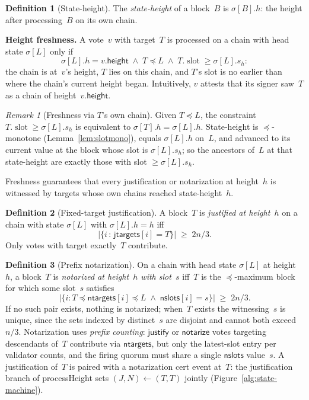 \ifx\litemode\undefined\documentclass{article}\fi
\newcommand{\slot}[0]{\ensuremath{\operatorname{\mathrm{slot}}}}
\newcommand{\height}{\mathsf{height}}
\newcommand{\just}{\ensuremath{\mathsf{justify}}\xspace}
\newcommand{\notar}{\ensuremath{\mathsf{notarize}}\xspace}
\newcommand{\jtargets}{\mathsf{jtargets}}
\newcommand{\ntargets}{\mathsf{ntargets}}
\newcommand{\nslots}{\mathsf{nslots}}
\newcommand{\processHeight}{\textsf{processHeight}\xspace}
\renewcommand{\paragraph}[1]{\vspace{7pt}\noindent\textbf{#1}}
\theoremstyle{plain}
\theoremstyle{definition}
\newtheorem{definition}{Definition}
\theoremstyle{remark}
\newtheorem{remark}{Remark}
\begin{document}
\begin{definition}[State-height]\label{def:sheight}
The \emph{state-height} of a block~$B$ is $\sigma[B].h$: the height after processing~$B$ on its own chain.
\end{definition}

\paragraph{Height freshness.}
A vote~$v$ with target~$T$ is processed on a chain with head state $\sigma[L]$ only if
\[
  \sigma[L].h = v.\height \;\wedge\; T \preceq L \;\wedge\; T.\slot \geq \sigma[L].s_h:
\]
the chain is at~$v$'s height, $T$ lies on this chain, and $T$'s slot is no earlier than where the chain's current height began.
Intuitively, $v$ attests that its signer saw~$T$ as a chain of height~$v.\height$.

\begin{remark}[Freshness via $T$'s own chain]\label{rem:fresh-equiv}
Given $T \preceq L$, the constraint $T.\slot \geq \sigma[L].s_h$ is equivalent to $\sigma[T].h = \sigma[L].h$.
State-height is $\preceq$-monotone (Lemma~\ref{lem:slotmono}), equals $\sigma[L].h$ on~$L$, and advanced to its current value at the block whose slot is $\sigma[L].s_h$; so the ancestors of~$L$ at that state-height are exactly those with slot $\geq \sigma[L].s_h$.
\end{remark}

Freshness guarantees that every justification or notarization at height~$h$ is witnessed by targets whose own chains reached state-height~$h$.

\begin{definition}[Fixed-target justification]\label{def:justification}
A block~$T$ is \emph{justified at height~$h$} on a chain with state $\sigma[L]$ with $\sigma[L].h = h$ iff
\[
  \bigl|\{i \,:\, \jtargets[i] = T\}\bigr| \;\geq\; 2n/3.
\]
Only votes with target exactly~$T$ contribute.
\end{definition}

\begin{definition}[Prefix notarization]\label{def:notarization}
On a chain with head state $\sigma[L]$ at height~$h$, a block~$T$ is \emph{notarized at height~$h$ with slot~$s$} iff~$T$ is the $\preceq$-maximum block for which some slot~$s$ satisfies
\[
  \bigl|\{i : T \preceq \ntargets[i] \preceq L \;\wedge\; \nslots[i] = s\}\bigr| \;\geq\; 2n/3.
\]
If no such pair exists, nothing is notarized; when~$T$ exists the witnessing~$s$ is unique, since the sets indexed by distinct~$s$ are disjoint and cannot both exceed~$n/3$.
Notarization uses \emph{prefix counting}: \just or \notar votes targeting descendants of~$T$ contribute via $\ntargets$, but only the latest-slot entry per validator counts, and the firing quorum must share a single $\nslots$ value~$s$.
A justification of~$T$ is paired with a notarization cert event at~$T$: the justification branch of \processHeight sets $(J, N) \gets (T, T)$ jointly (Figure~\ref{alg:state-machine}).
\end{definition}
\end{document}
